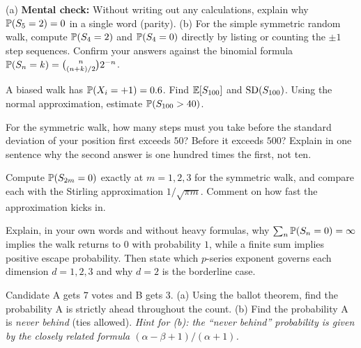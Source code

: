 \begin{exercise}
\label{ch26:ex-warmup}
(a) \textbf{Mental check:} Without writing out any calculations, explain why
$\P(S_5 = 2) = 0$ in a single word (parity). (b) For the simple symmetric
random walk, compute $\P(S_4 = 2)$ and $\P(S_4 = 0)$ directly by listing or
counting the $\pm 1$ step sequences. Confirm your answers against the binomial
formula $\P(S_n = k) = \binom{n}{(n+k)/2}2^{-n}$.
\end{exercise}

\begin{exercise}
\label{ch26:ex-biasedmoments}
A biased walk has $\P(X_i = +1) = 0.6$. Find $\E[S_{100}]$ and
$\SD(S_{100})$. Using the normal approximation, estimate $\P(S_{100} > 40)$.
\end{exercise}

\begin{exercise}
\label{ch26:ex-sqrtlaw}
For the symmetric walk, how many steps must you take before the standard
deviation of your position first exceeds $50$? Before it exceeds $500$? Explain
in one sentence why the second answer is one hundred times the first, not ten.
\end{exercise}

\begin{exercise}
\label{ch26:ex-return}
Compute $\P(S_{2m} = 0)$ exactly at $m = 1, 2, 3$ for the symmetric walk, and
compare each with the Stirling approximation $1/\sqrt{\pi m}$. Comment on how
fast the approximation kicks in.
\end{exercise}

\begin{exercise}
\label{ch26:ex-rectrans}
Explain, in your own words and without heavy formulas, why
$\sum_n \P(S_n = 0) = \infty$ implies the walk returns to $0$ with probability
$1$, while a finite sum implies positive escape probability. Then state which
$p$-series exponent governs each dimension $d = 1, 2, 3$ and why $d = 2$ is the
borderline case.
\end{exercise}

\begin{exercise}
\label{ch26:ex-ballot}
Candidate A gets $7$ votes and B gets $3$. (a) Using the ballot theorem, find
the probability A is strictly ahead throughout the count. (b) Find the
probability A is \emph{never behind} (ties allowed). \emph{Hint for (b): the
``never behind'' probability is given by the closely related formula
$(\alpha - \beta + 1)/(\alpha + 1)$.}
\end{exercise}

